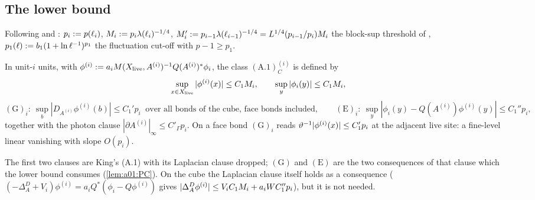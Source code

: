 \subsection{The lower bound}\label{app:a01:lower}

Following \cite[Sect.~3]{Ba1} and \cite[Appendix]{K1}: $p_i:= p(\ell_i)$, $M_i:= p_i\lambda(\ell_i)^{-1/4}$, $M_i':= p_{i-1}\lambda(\ell_{i-1})^{-1/4}=L^{1/4}(p_{i-1}/p_i)M_i$ the block-sup threshold of \cite[(3.2)]{K1}, $p_1(\ell):= b_1(1+\ln\ell^{-1})^{p_1}$ the fluctuation cut-off with $p-1\ge p_1$.

\begin{definition}\label{def:a01:class}
In unit-$i$ units, with $\phi^{(i)}:= a_iM(X_{\mathrm{live}},A^{(i)})^{-1}Q(A^{(i)})^*\phi_i$, the class $(\mathrm{A.1})^{(i)}_C$ is defined by
\[
\sup_{x\in X_{\mathrm{live}}}|\phi^{(i)}(x)|\le C_1M_i,\qquad\sup_y|\phi_i(y)|\le C_1M_i,
\]
\[
(\mathrm G)_i:\ \sup_{b}|D_{A^{(i)}}\phi^{(i)}(b)|\le C_1'p_i\ \text{ over all bonds of the cube, face bonds included},\qquad(\mathrm E)_i:\ \sup_y|\phi_i(y)-Q(A^{(i)})\phi^{(i)}(y)|\le C_1''p_i,
\]
together with the photon clause $|\partial A^{(i)}|_\infty\le C'_\Gamma p_i$. On a face bond $(\mathrm G)_i$ reads $\vartheta^{-1}|\phi^{(i)}(x)|\le C_1'p_i$ at the adjacent live site: a fine-level linear vanishing with slope $O(p_i)$.
\end{definition}

The first two clauses are King's (A.1) with its Laplacian clause dropped; $(\mathrm G)$ and $(\mathrm E)$ are the two consequences of that clause which the lower bound consumes (\cref{lem:a01:PC}). On the cube the Laplacian clause itself holds as a consequence ($(-\Delta^D_A+V_i)\phi^{(i)}=a_iQ^*(\phi_i-Q\phi^{(i)})$ gives $|\Delta^D_A\phi^{(i)}|\le V_iC_1M_i+a_iW C_1''p_i$), but it is not needed.


